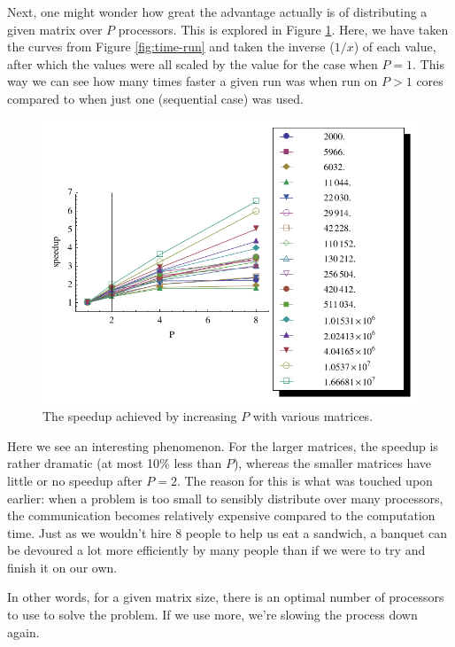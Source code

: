 \documentclass[a4paper]{article}
\begin{document}
Next, one might wonder how great the advantage actually is of distributing a given matrix over $P$ processors.
This is explored in Figure \ref{fig:speedup}. Here, we have taken the curves from Figure \ref{fig:time-run} and
taken the inverse ($1/x$) of each value, after which the values were all scaled by the value for the case
when $P=1$. This way we can see how many times faster a given run was when run on $P>1$ cores compared to
when just one (sequential case) was used.




\begin{figure}[h]
    \begin{center}
        \includegraphics[width=\legendplotsize]{img/speedup.pdf}
    \end{center}
    \caption{The speedup achieved by increasing $P$ with various matrices.}
    \label{fig:speedup}
\end{figure}


Here we see an interesting phenomenon. For the larger matrices, the speedup is rather dramatic
(at most 10\% less than $P$), whereas the smaller matrices have little or no speedup after $P=2$. The
reason for this is what was touched upon earlier: when a problem is too small to sensibly distribute over
many processors, the communication becomes relatively expensive compared to the computation time. Just as we
wouldn't hire 8 people to help us eat a sandwich, a banquet can be devoured a lot more efficiently by many
people than if we were to try and finish it on our own.

In other words, for a given matrix size, there is an optimal number of processors to use
to solve the problem. If we use more, we're slowing the process down again.
\end{document}
